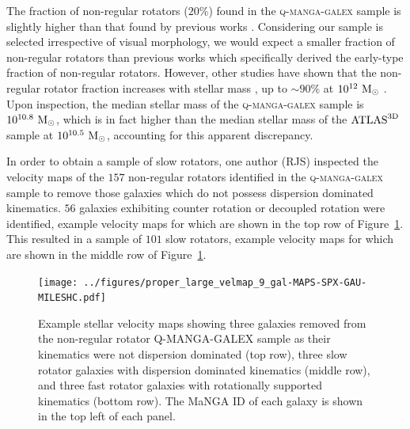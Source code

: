 \documentclass[useAMS,usenatbib]{mn2e}
\begin{document}
The fraction of non-regular rotators ($20\%$) found in the \textsc{q-manga-galex} sample is slightly higher than that found by previous works \citep[$14-17\%$ of early-types in the $\rm{ATLAS}^{\rm{3D}}$ sample; ][]{emsellem11, stott16}. Considering our sample is selected irrespective of visual morphology, we would expect a smaller fraction of non-regular rotators than previous works which specifically derived the early-type fraction of non-regular rotators. However, other studies have shown that the non-regular rotator fraction increases with stellar mass \citep{cappellari13}, up to $\sim90\%$ at $10^{12}~\rm{M}_{\odot}$ \citep{veale17}. Upon inspection, the median stellar mass of the \textsc{q-manga-galex} sample is $10^{10.8}~\rm{M}_{\odot}$, which is in fact higher than the median stellar mass of the $\rm{ATLAS}^{\rm{3D}}$ sample at $10^{10.5}~\rm{M}_{\odot}$, accounting for this apparent discrepancy.

In order to obtain a sample of slow rotators, one author (RJS) inspected the velocity maps of the $157$ non-regular rotators identified in the \textsc{q-manga-galex} sample to remove those galaxies which do not possess dispersion dominated kinematics. $56$ galaxies exhibiting  counter rotation or decoupled rotation were identified, example velocity maps for which are shown in the top row of Figure~\ref{fig:exvelmaps}. This resulted in a sample of $101$ slow rotators, example velocity maps for which are shown in the middle row of Figure~\ref{fig:exvelmaps}.  


\begin{figure}
\centering
\texttt{[image: ../figures/proper\_large\_velmap\_9\_gal-MAPS-SPX-GAU-MILESHC.pdf]}
\caption{Example stellar velocity maps showing three galaxies removed from the non-regular rotator \textsc{Q-MANGA-GALEX} sample as their kinematics were not dispersion dominated (top row), three slow rotator galaxies with dispersion dominated kinematics (middle row), and three fast rotator galaxies with rotationally supported kinematics (bottom row). The MaNGA ID of each galaxy is shown in the top left of each panel.}
\label{fig:exvelmaps}
\end{figure}  
\end{document}

